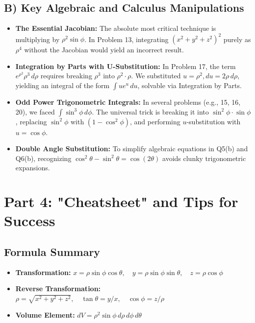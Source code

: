 \documentclass[12pt]{article}
\begin{document}
\subsection{B) Key Algebraic and Calculus Manipulations}
\begin{itemize}
    \item \textbf{The Essential Jacobian:} The absolute most critical technique is multiplying by $\rho^2 \sin\phi$. In Problem 13, integrating $(x^2+y^2+z^2)^2$ purely as $\rho^4$ without the Jacobian would yield an incorrect result.
    \item \textbf{Integration by Parts with U-Substitution:} In Problem 17, the term $e^{\rho^2} \rho^3 \, d\rho$ requires breaking $\rho^3$ into $\rho^2 \cdot \rho$. We substituted $u = \rho^2, du = 2\rho \, d\rho$, yielding an integral of the form $\int u e^u \, du$, solvable via Integration by Parts.
    \item \textbf{Odd Power Trigonometric Integrals:} In several problems (e.g., 15, 16, 20), we faced $\int \sin^3\phi \, d\phi$. The universal trick is breaking it into $\sin^2\phi \cdot \sin\phi$, replacing $\sin^2\phi$ with $(1 - \cos^2\phi)$, and performing $u$-substitution with $u = \cos\phi$.
    \item \textbf{Double Angle Substitution:} To simplify algebraic equations in Q5(b) and Q6(b), recognizing $\cos^2\theta - \sin^2\theta = \cos(2\theta)$ avoids clunky trigonometric expansions.
\end{itemize}

\newpage
\section{Part 4: "Cheatsheet" and Tips for Success}

\subsection{Formula Summary}
\begin{itemize}
    \item \textbf{Transformation:} $x = \rho \sin\phi \cos\theta, \quad y = \rho \sin\phi \sin\theta, \quad z = \rho \cos\phi$
    \item \textbf{Reverse Transformation:} $\rho = \sqrt{x^2+y^2+z^2}, \quad \tan\theta = y/x, \quad \cos\phi = z/\rho$
    \item \textbf{Volume Element:} $dV = \rho^2 \sin\phi \, d\rho \, d\phi \, d\theta$
\end{itemize}
\end{document}
